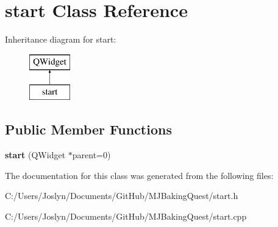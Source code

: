 \hypertarget{classstart}{\section{start Class Reference}
\label{classstart}
}
Inheritance diagram for start\-:\begin{figure}[H]
\begin{center}
\leavevmode
\includegraphics[height=2.000000cm]{classstart}
\end{center}
\end{figure}
\subsection*{Public Member Functions}
\begin{DoxyCompactItemize}
\item 
\hypertarget{classstart_ac258c2204d5abdb20fec5de264236a41}{{\bfseries start} (Q\-Widget $\ast$parent=0)}\label{classstart_ac258c2204d5abdb20fec5de264236a41}

\end{DoxyCompactItemize}


The documentation for this class was generated from the following files\-:\begin{DoxyCompactItemize}
\item 
C\-:/\-Users/\-Joslyn/\-Documents/\-Git\-Hub/\-M\-J\-Baking\-Quest/start.\-h\item 
C\-:/\-Users/\-Joslyn/\-Documents/\-Git\-Hub/\-M\-J\-Baking\-Quest/start.\-cpp\end{DoxyCompactItemize}
